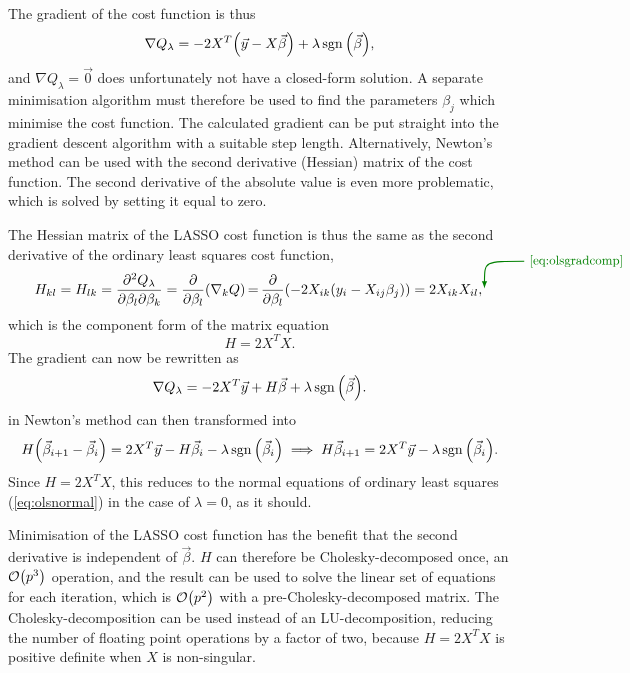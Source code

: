 \documentclass[11pt,british,a4paper]{article}
\newcommand{\husk}[2]{\tikz[baseline,remember picture,inner sep=0pt,outer sep=0pt]{\node[anchor=base] (#1) {\(#2\)};}}
\DeclareMathOperator{\sgn}{sgn}
\numberwithin{equation}{section}
\begin{document}
The gradient of the cost function is thus
\begin{equation}
    \nabla Q_\lambda = -2 X^T \qty(\vec{y} - X\vec{\beta}) + \lambda \sgn\qty(\vec{\beta}),
\end{equation}
and \(\nabla Q_\lambda = \vec{0}\) does unfortunately not have a closed-form solution.
A separate minimisation algorithm must therefore be used to find the parameters \(\beta_j\) which minimise the cost function.
The calculated gradient can be put straight into the gradient descent algorithm with a suitable step length.
Alternatively, Newton's method can be used with the second derivative (Hessian) matrix of the cost function.
The second derivative of the absolute value is even more problematic, which is solved by setting it equal to zero.

The Hessian matrix of the LASSO cost function is thus the same as the second derivative of the ordinary least squares cost function,
\begin{equation}
    H_{kl} = H_{lk} = \pdv{Q_\lambda}{\beta_l}{\beta_k}
           = \pdv{\beta_l}(\nabla_k Q)
           \,\husk{gradref}{=}\, \pdv{\beta_l}(-2X_{ik}\qty(y_i-X_{ij}\beta_j))
           = 2X_{ik}X_{il},
\tikz[>=latex,overlay,remember picture,thick]{\draw[<-,gronn] (gradref) .. controls ++(0,0.75) and ++(-1,0) .. ++(1,0.75) node[anchor=west] {\small\ref{eq:olsgradcomp}};}
\end{equation}
which is the component form of the matrix equation
\begin{equation}
    H = 2 X^T X.
\end{equation}
The gradient can now be rewritten as
\begin{equation}
    \nabla Q_\lambda = -2 X^T \vec{y} + H\vec{\beta} + \lambda \sgn\qty(\vec{\beta}).
\end{equation}
 in Newton's method can then transformed into
\begin{equation}
    H\qty(\vec{\beta}_{i+1} - \vec{\beta}_i) = 2X^T \vec{y}  - H\vec{\beta}_i - \lambda \sgn\qty(\vec{\beta}_i)
    \implies H\vec{\beta}_{i+1} = 2X^T\vec{y} - \lambda \sgn\qty(\vec{\beta}_i). \label{eq:lassonewton}
\end{equation}
Since \(H=2X^T X\), this reduces to the normal equations of ordinary least squares (\vref*{eq:olsnormal}) in the case of \(\lambda=0\), as it should.

Minimisation of the LASSO cost function has the benefit that the second derivative is independent of \(\vec{\beta}\).
\(H\) can therefore be Cholesky-decomposed once, an \(\mathcal{O}\qty(p^3)\) operation, and the result can be used to solve the linear set of equations for each iteration, which is \(\mathcal{O}\qty(p^2)\) with a pre-Cholesky-decomposed matrix.
The Cholesky-decomposition can be used instead of an LU-decomposition, reducing the number of floating point operations by a factor of two, because \(H=2X^T X\) is positive definite when \(X\) is non-singular.
\end{document}
